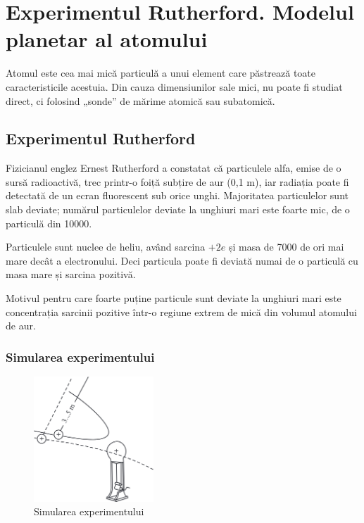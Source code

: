 \section{Experimentul Rutherford. Modelul planetar al atomului}

Atomul este cea mai mică particulă a unui element care păstrează toate
caracteristicile acestuia. Din cauza dimensiunilor sale mici, nu poate fi
studiat direct, ci folosind „sonde” de mărime atomică sau subatomică.

\subsection{Experimentul Rutherford}

Fizicianul englez Ernest Rutherford a constatat că particulele alfa, emise de o
sursă radioactivă, trec printr-o foiță subțire de aur (0,1 {\textmu}m), iar
radiația {\alpha} poate fi detectată de un ecran fluorescent sub orice unghi.
Majoritatea particulelor {\alpha} sunt slab deviate; numărul particulelor deviate la
unghiuri mari este foarte mic, de o particulă din 10000.

Particulele {\alpha} sunt nuclee de heliu, având sarcina $+2e$ și masa de 7000
de ori mai mare decât a electronului. Deci particula {\alpha} poate fi deviată
numai de o particulă cu masa mare și sarcina pozitivă.

Motivul pentru care foarte puține particule sunt deviate la unghiuri mari este
concentrația sarcinii pozitive într-o regiune extrem de mică din volumul
atomului de aur.

\subsubsection*{Simularea experimentului}

\begin{figure}
    \centering
    \includegraphics[width=0.4\textwidth]{fig/rutherford}
    \caption{Simularea experimentului}
\end{figure}

